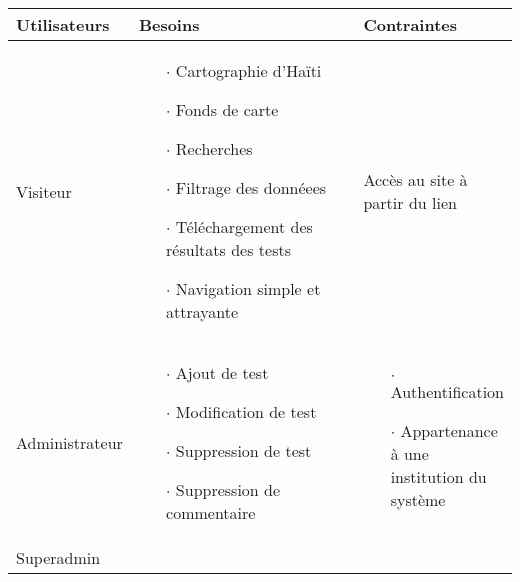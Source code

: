 \par    
\begin{table}
        \centering
        \begin{tabular}{|p{0.21\linewidth}|p{0.54\linewidth}|p{0.33\linewidth}|}
        \hline
                \textbf{Utilisateurs} & \textbf{Besoins} & 
                \textbf{Contraintes}  \\
                \hline
                        Visiteur & 
                        \begin{itemize}
                                 \item[$\cdot$]  Cartographie d'Haïti
                                 \item[$\cdot$]  Fonds de carte
                                 \item[$\cdot$]  Recherches
                                 \item[$\cdot$]  Filtrage des donnéees
                                 \item[$\cdot$]  Téléchargement des résultats des tests
                                 \item[$\cdot$]  Navigation simple et attrayante
                        \end{itemize} & 
                        Accès au site à partir du lien \\
                \hline
                        Administrateur & 
                        \begin{itemize}
                                \item[$\cdot$]  Ajout de test
                                \item[$\cdot$]  Modification de test
                                \item[$\cdot$]  Suppression de test
                                \item[$\cdot$]  Suppression de commentaire
                        \end{itemize} & 
                        \begin{itemize}
                                \item[$\cdot$] Authentification 
                                \item[$\cdot$] Appartenance à une institution du système 
                        \end{itemize}
                         \\
                \hline
                        Superadmin & 
                        \begin{itemize}

\end{itemize}
\end{tabular}
\end{table}
